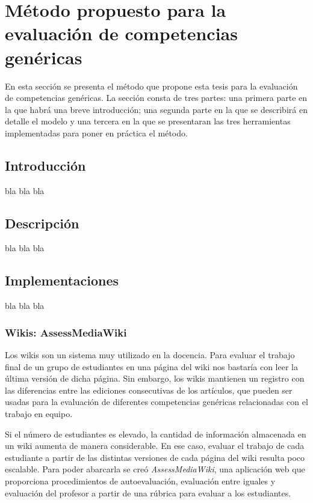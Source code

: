 \section{Método propuesto para la evaluación de competencias genéricas}

En esta sección se presenta el método que propone esta tesis para la evaluación de competencias genéricas. La sección consta de tres partes: una primera parte en la que habrá una breve introducción; una segunda parte en la que se describirá en detalle el modelo y una tercera en la que se presentaran las tres herramientas implementadas para poner en práctica el método.

\subsection{Introducción}

bla bla bla

\subsection{Descripción}

bla bla bla

\subsection{Implementaciones}

bla bla bla

\subsubsection{Wikis: AssessMediaWiki}

Los wikis son un sistema muy utilizado en la docencia. Para evaluar el trabajo final de un grupo de estudiantes en una página del wiki nos bastaría con leer la última versión de dicha página. Sin embargo, los wikis mantienen un registro con las diferencias entre las ediciones consecutivas de los artículos, que pueden ser usadas para la evaluación de diferentes competencias genéricas relacionadas con el trabajo en equipo.

Si el número de estudiantes es elevado, la cantidad de información almacenada en un wiki aumenta de manera considerable. En ese caso, evaluar el trabajo de cada estudiante a partir de las distintas versiones de cada página del wiki resulta poco escalable. Para poder abarcarla se creó \emph{AssessMediaWiki}, una aplicación web que proporciona procedimientos de autoevaluación, evaluación entre iguales y evaluación del profesor a partir de una rúbrica para evaluar a los estudiantes.

